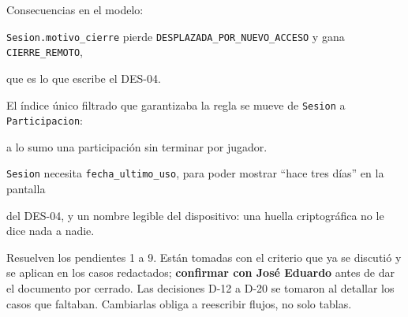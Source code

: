 Consecuencias en el modelo:

\begin{reglas}
  \item \texttt{Sesion.motivo\_\allowbreak{}cierre} pierde \texttt{DESPLAZADA\_\allowbreak{}POR\_\allowbreak{}NUEVO\_\allowbreak{}ACCESO} y gana \texttt{CIERRE\_\allowbreak{}REMOTO},
\end{reglas}

que es lo que escribe el \mbox{DES-04}.

\begin{reglas}
  \item El índice único filtrado que garantizaba la regla se mueve de \texttt{Sesion} a \texttt{Participacion}:
\end{reglas}

a lo sumo una participación sin terminar por jugador.

\begin{reglas}
  \item \texttt{Sesion} necesita \texttt{fecha\_\allowbreak{}ultimo\_\allowbreak{}uso}, para poder mostrar ``hace tres días'' en la pantalla
\end{reglas}

del \mbox{DES-04}, y un nombre legible del dispositivo: una huella criptográfica no le dice nada a nadie.

Resuelven los pendientes 1 a 9. Están tomadas con el criterio que ya se discutió y se aplican en los casos redactados; \textbf{confirmar con José Eduardo} antes de dar el documento por cerrado. Las decisiones \mbox{D-12} a \mbox{D-20} se tomaron al detallar los casos que faltaban. Cambiarlas obliga a reescribir flujos, no solo tablas.

